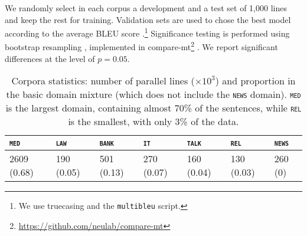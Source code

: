\documentclass[11pt,a4paper]{article}
\newcommand{\fyDone}[1]{\done[FY]\Todo[FY:]{\textcolor{orange}{#1}}}
\newcommand{\domain}[1]{\texttt{\textsc{#1}}}
\begin{document}
We randomly select in each corpus a development and a test set of 1,000 lines and keep the rest for training. Validation sets are used to chose the best model according to the average BLEU score \cite{Papineni02bleu}.\footnote{We use truecasing and the \texttt{multibleu} script.}\fyDone{A word about meta-parameter settings} Significance testing is performed using bootstrap resampling \cite{Koehn04statistical}, implemented in compare-mt\footnote{\url{https://github.com/neulab/compare-mt}} \cite{Neubig19compare-mt}. We report significant differences at the level of $p=0.05$.\fyDone{Fix correct p value}


\begin{table*}[htbp]
  \centering
  \begin{tabular}{ |lllllll|} %
    \hline
    \domain{med} & \domain{law} & \domain{bank} & \domain{it} & \domain{talk} & \domain{rel} & \domain{news} \\
    \hline
    2609 (0.68) & 190 (0.05)  & 501 (0.13) & 270 (0.07) & 160 (0.04) & 130 (0.03) & 260 (0) \\
    \hline
  \end{tabular}
\caption{Corpora statistics: number of parallel lines ($\times 10^3$) and proportion in the basic domain mixture (which does not include the \domain{news} domain). \domain{med} is the largest domain, containing almost 70\% of the sentences, while \domain{rel} is the smallest, with only 3\% of the data.}
\label{tab:Corpora}
\end{table*}
\end{document}
